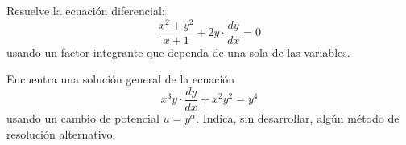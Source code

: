 \documentclass[12pt]{article}
\begin{document}
\begin{ejercicio}
    Resuelve la ecuación diferencial:
    \begin{equation*}
        \dfrac{x^2+y^2}{x+1}+2y\cdot \dfrac{dy}{dx}=0
    \end{equation*}
    usando un factor integrante que dependa de una sola de las variables.
\end{ejercicio}

\begin{ejercicio}
    Encuentra una solución general de la ecuación
    \begin{equation*}
        x^3y\cdot \dfrac{dy}{dx} + x^2y^2=y^4
    \end{equation*}
    usando un cambio de potencial $u=y^\alpha$. Indica, sin desarrollar, algún método de resolución alternativo.
\end{ejercicio}
\end{document}
